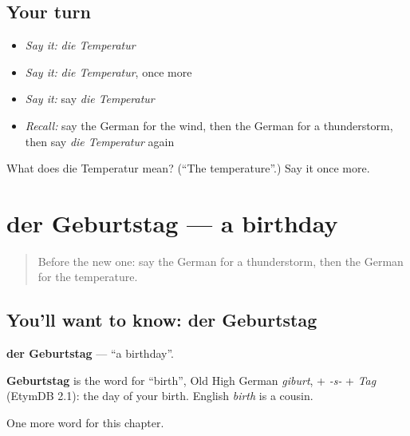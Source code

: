 \subsection*{Your turn}
\begin{itemize}
\raggedright
  \item \emph{Say it:} \emph{die Temperatur}
  \item \emph{Say it:} \emph{die Temperatur}, once more
  \item \emph{Say it:} say \emph{die Temperatur}
  \item \emph{Recall:} say the German for the wind, then the German for a thunderstorm, then say \emph{die Temperatur} again
\end{itemize}

\begin{tcolorbox}[breakable,colback=teal!4,colframe=teal!35!black,title={Before you move on}]
What does die Temperatur mean? (\textquotedblleft{}The temperature\textquotedblright{}.) Say it once more.
\end{tcolorbox}
\section[der Geburtstag]{der Geburtstag — a birthday}

\label{lesson:GE-C163-geburtstag}



\begin{quote}
Before the new one: say the German for a thunderstorm, then the German for the temperature.
\end{quote}

\subsection*{You'll want to know: der Geburtstag}
\textbf{der Geburtstag} — \textquotedblleft{}a birthday\textquotedblright{}.

\begin{cousinweb}
\textbf{Geburtstag} is the word for \textquotedblleft{}birth\textquotedblright{}, Old High German \emph{giburt}, + \emph{-s-} + \emph{Tag} (EtymDB 2.1): the day of your birth. English \emph{birth} is a cousin.
\end{cousinweb}

\begin{grammarlens}[title={What you've built}]
One more word for this chapter.
\end{grammarlens}

